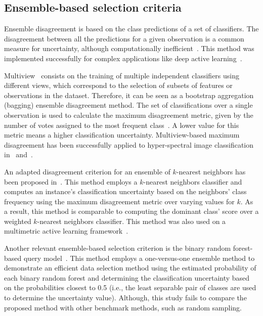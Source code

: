 \documentclass[parskip=full]{scrartcl}
\begin{document}
\subsection{Ensemble-based selection criteria}

Ensemble disagreement is based on the class predictions of a set of classifiers.
The disagreement between all the predictions for a given observation is a common
measure for uncertainty, although computationally
inefficient~\cite{Ruzicka2020,Pasolli2016}. This method was implemented
successfully for complex applications like deep active
learning~\cite{Ruzicka2020}.

Multiview~\cite{Muslea2006} consists on the training of multiple independent
classifiers using different views, which correspond to the selection of subsets
of features or observations in the dataset. Therefore, it can be seen as a
bootstrap aggregation (bagging) ensemble disagreement method. The set of
classifications over a single observation is used to calculate the maximum
disagreement metric, given by the number of votes assigned to the most frequent
class~\cite{Shrivastava2021}. A lower value for this metric means a higher
classification uncertainty. Multiview-based maximum disagreement has been
successfully applied to hyper-spectral image classification in~\cite{Di2012}
and~\cite{Zhou2014}.

An adapted disagreement criterion for an ensemble of $k$-nearest neighbors has
been proposed in~\cite{Pasolli2016}. This method employs a $k$-nearest neighbors
classifier and computes an instance's classification uncertainty based on the
neighbors' class frequency using the maximum disagreement metric over varying
values for $k$. As a result, this method is comparable to computing the dominant
class' score over a weighted $k$-nearest neighbors classifier. This method was
also used on a multimetric active learning framework~\cite{Zhang2016}.

Another relevant ensemble-based selection criterion is the binary random
forest-based query model~\cite{Su2020}. This method employs a one-versus-one
ensemble method to demonstrate an efficient data selection method using the
estimated probability of each binary random forest and determining the
classification uncertainty based on the probabilities closest to 0.5 (i.e., the
least separable pair of classes are used to determine the uncertainty value).
Although, this study fails to compare the proposed method with other benchmark
methods, such as random sampling.
\end{document}
